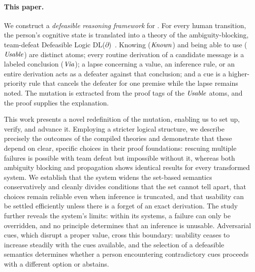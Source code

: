 \paragraph{This paper.} We construct a \emph{defeasible reasoning framework} for \forget{}. For every human transition, the person's cognitive state is translated into a theory of the ambiguity-blocking, team-defeat Defeasible Logic DL($\partial$)~\cite{nute1994defeasible,antoniou2001representation}. Knowing ($\mathit{Known}$) and being able to use ($\mathit{Usable}$) are distinct atoms; every routine derivation of a candidate message is a labeled conclusion ($\mathit{Via}$); a lapse concerning a value, an inference rule, or an entire derivation acts as a defeater against that conclusion; and a cue is a higher-priority rule that cancels the defeater for one premise while the lapse remains noted. The mutation is extracted from the proof tags of the $\mathit{Usable}$ atoms, and the proof supplies the explanation.

This work presents a novel redefinition of the \forget{} mutation, enabling us to set up, verify, and advance it. Employing a stricter logical structure, we describe precisely the outcomes of the compiled theories and demonstrate that these depend on clear, specific choices in their proof foundations: rescuing multiple failures is possible with team defeat but impossible without it, whereas both ambiguity blocking and propagation shows identical results for every transformed system. We establish that the system widens the set-based semantics conservatively and cleanly divides conditions that the \Forget{} set cannot tell apart, that choices remain reliable even when inference is truncated, and that usability can be settled efficiently unless there is a forget of an exact derivation. The study further reveals the system's limits: within its systems, a failure can only be overridden, and no principle determines that an inference is unusable. Adversarial cues, which disrupt a proper value, cross this boundary: usability ceases to increase steadily with the cues available, and the selection of a defeasible semantics determines whether a person encountering contradictory cues proceeds with a different option or abstains.


